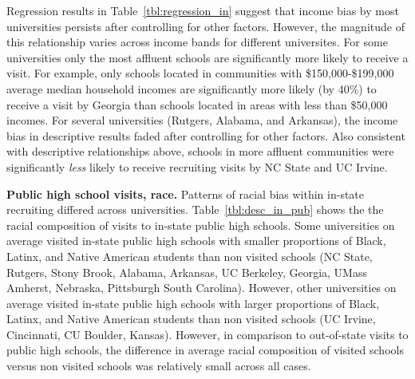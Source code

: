 \documentclass[twoside]{article}
\begin{document}
Regression results in Table~\ref{tbl:regression_in} suggest that income bias by most universities persists after controlling for other factors. However, the magnitude of this relationship varies across income bands for different universites. For some universities only the most affluent schools are significantly more likely to receive a visit. For example, only schools located in communities with \$150,000-\$199,000 average median household incomes are significantly more likely (by 40\%) to receive a visit by Georgia than schools located in areas with less than \$50,000 incomes. For several universities (Rutgers, Alabama, and Arkansas), the income bias in descriptive results faded after controlling for other factors. Also consistent with descriptive relationships above, schools in more affluent communities were significantly \textit{less} likely to receive recruiting visits by NC State and UC Irvine.

\textbf{Public high school visits, race.} Patterns of racial bias within in-state recruiting differed across universities. Table~\ref{tbl:desc_in_pub} shows the the racial composition of visits to in-state public high schools. Some universities on average visited in-state public high schools with smaller proportions of Black, Latinx, and Native American students than non visited schools (NC State, Rutgers, Stony Brook, Alabama, Arkansas, UC Berkeley, Georgia, UMass Amherst, Nebraska, Pittsburgh South Carolina). However, other universities on average visited in-state public high schools with larger proportions of Black,  Latinx, and Native American students than non visited schools (UC Irvine, Cincinnati, CU Boulder, Kansas). However, in comparison to out-of-state visits to public high schools, the difference in average racial composition of visited schools versus non visited schools was relatively small across all cases.
\end{document}
